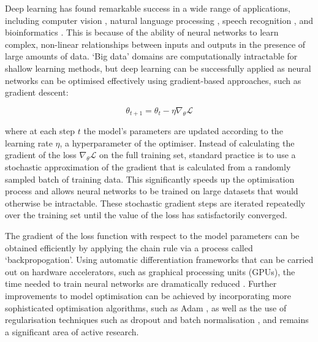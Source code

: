 Deep learning has found remarkable success in a wide range of applications, including computer vision \cite{Wang2020CLIP}, natural language processing \cite{OpenAI2021GPT3}, speech recognition \cite{Schneider2019wav2vec}, and bioinformatics \cite{Jumper2021AlphaFold, Sapoval2022Bioinformatics}. This is because of the ability of neural networks to learn complex, non-linear relationships between inputs and outputs in the presence of large amounts of data. `Big data' domains are computationally intractable for shallow learning methods, but deep learning can be successfully applied as neural networks can be optimised effectively using  gradient-based approaches, such as gradient descent:

\begin{equation}
    \theta_{t+1} = \theta_t - \eta \nabla_{\theta} \mathcal{L}
\end{equation}

where at each step $t$ the model's parameters are updated according to the learning rate $\eta$, a hyperparameter of the optimiser. Instead of calculating the gradient of the loss $\nabla_{\theta}\mathcal{L}$ on the full training set, standard practice is to use a stochastic approximation of the gradient that is calculated from a randomly sampled batch of training data. This significantly speeds up the optimisation process and allows neural networks to be trained on large datasets that would otherwise be intractable. These stochastic gradient steps are iterated repeatedly over the training set until the value of the loss has satisfactorily converged. 

The gradient of the loss function with respect to the model parameters can be obtained efficiently by applying the chain rule via a process called `backpropogation'. Using automatic differentiation frameworks that can be carried out on hardware accelerators, such as graphical processing units (GPUs), the time needed to train neural networks are dramatically reduced \cite{Baydin2018autodiff}. Further improvements to model optimisation can be achieved by incorporating more sophisticated optimisation algorithms, such as Adam \cite{Kingma2014Adam}, as well as the use of regularisation techniques such as dropout \cite{Srivastava2014dropout} and batch normalisation \cite{Ioffe2015batchnorm}, and remains a significant area of active research.

